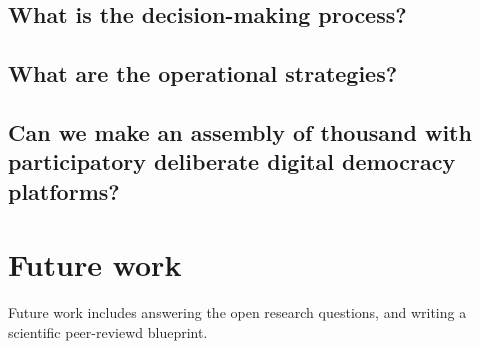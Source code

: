 \documentclass{IEEEtran}
\begin{document}
\subsection{What is the decision-making process?}


\subsection{What are the operational strategies?}

\subsection{Can we make an assembly of thousand with participatory deliberate digital democracy platforms?}




\section{Future work}
Future work includes answering the open research questions, and writing a scientific peer-reviewd blueprint.

\clearpage
\newpage


\printbibliography


% 
\end{document}

